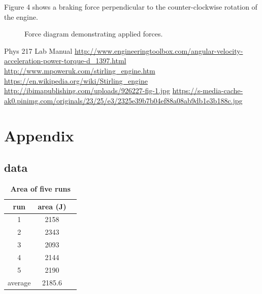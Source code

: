 \documentclass[9pt,twocolumn,twoside]{osajnl}
\begin{document}
Figure 4 shows a braking force perpendicular to the counter-clockwise rotation of the engine.
\begin{figure}[htbp]
\centering
{}
\caption{Force diagram demonstrating applied forces.}
\label{fig:forcediagram}
\end{figure}

\bigskip



 
\begin{thebibliography}{1}
Phys 217 Lab Manual
\url{http://www.engineeringtoolbox.com/angular-velocity-acceleration-power-torque-d_1397.html}
\url{http://www.mpoweruk.com/stirling_engine.htm}
\url{https://en.wikipedia.org/wiki/Stirling_engine}
\url{http://ibimapublishing.com/uploads/926227-fig-1.jpg}
\url{https://s-media-cache-ak0.pinimg.com/originals/23/25/e3/2325e39b7b04ef88a08ab9db1e3b188c.jpg}

\end{thebibliography}
\bigskip
\section{Appendix}
\subsection{data}

\begin{table}[htbp]
\centering
\caption{\bf Area of five runs}
\begin{tabular}{ccc}
\hline
run & area (J) \\
\hline
1 & 2158\\
2 & 2343\\
3 & 2093\\
4 & 2144\\
5 & 2190\\
\hline
average & 2185.6\\

\hline
\end{tabular}
  \label{tab:shape-functions}
\end{table}
\end{document}
